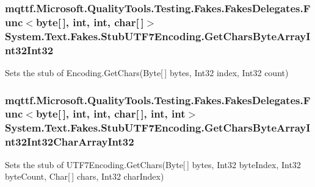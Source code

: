 \hypertarget{class_system_1_1_text_1_1_fakes_1_1_stub_u_t_f7_encoding_aa067e06076b0130f5872c63f892f2239}{
\subsubsection[{Get\-Chars\-Byte\-Array\-Int32\-Int32}]{\setlength{\rightskip}{0pt plus 5cm}mqttf.\-Microsoft.\-Quality\-Tools.\-Testing.\-Fakes.\-Fakes\-Delegates.\-Func$<$byte\mbox{[}$\,$\mbox{]}, int, int, char\mbox{[}$\,$\mbox{]}$>$ System.\-Text.\-Fakes.\-Stub\-U\-T\-F7\-Encoding.\-Get\-Chars\-Byte\-Array\-Int32\-Int32}}\label{class_system_1_1_text_1_1_fakes_1_1_stub_u_t_f7_encoding_aa067e06076b0130f5872c63f892f2239}


Sets the stub of Encoding.\-Get\-Chars(\-Byte\mbox{[}$\,$\mbox{]} bytes, Int32 index, Int32 count)

\hypertarget{class_system_1_1_text_1_1_fakes_1_1_stub_u_t_f7_encoding_ac0fdabd76fe2ed1b6f2fdaeb6ea68746}{
\subsubsection[{Get\-Chars\-Byte\-Array\-Int32\-Int32\-Char\-Array\-Int32}]{\setlength{\rightskip}{0pt plus 5cm}mqttf.\-Microsoft.\-Quality\-Tools.\-Testing.\-Fakes.\-Fakes\-Delegates.\-Func$<$byte\mbox{[}$\,$\mbox{]}, int, int, char\mbox{[}$\,$\mbox{]}, int, int$>$ System.\-Text.\-Fakes.\-Stub\-U\-T\-F7\-Encoding.\-Get\-Chars\-Byte\-Array\-Int32\-Int32\-Char\-Array\-Int32}}\label{class_system_1_1_text_1_1_fakes_1_1_stub_u_t_f7_encoding_ac0fdabd76fe2ed1b6f2fdaeb6ea68746}


Sets the stub of U\-T\-F7\-Encoding.\-Get\-Chars(\-Byte\mbox{[}$\,$\mbox{]} bytes, Int32 byte\-Index, Int32 byte\-Count, Char\mbox{[}$\,$\mbox{]} chars, Int32 char\-Index)

